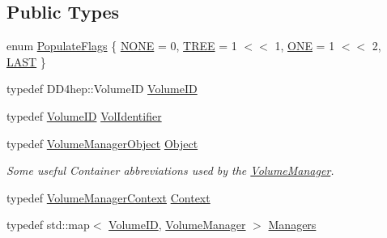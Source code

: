 \subsection*{Public Types}
\begin{DoxyCompactItemize}
\item 
enum \hyperlink{class_d_d4hep_1_1_geometry_1_1_volume_manager_a1c25b37c1377654bf2fbe1cf4743ebde}{Populate\+Flags} \{ \hyperlink{class_d_d4hep_1_1_geometry_1_1_volume_manager_a1c25b37c1377654bf2fbe1cf4743ebdea8562837522298e9c40ab9cd35d9307ba}{N\+O\+NE} = 0, 
\hyperlink{class_d_d4hep_1_1_geometry_1_1_volume_manager_a1c25b37c1377654bf2fbe1cf4743ebdeaf55015e5bb5659a574e760177f74324f}{T\+R\+EE} = 1 $<$$<$ 1, 
\hyperlink{class_d_d4hep_1_1_geometry_1_1_volume_manager_a1c25b37c1377654bf2fbe1cf4743ebdeafbb9de2f3dcf9fbe2da0b22fa5cafac1}{O\+NE} = 1 $<$$<$ 2, 
\hyperlink{class_d_d4hep_1_1_geometry_1_1_volume_manager_a1c25b37c1377654bf2fbe1cf4743ebdea50ba5350b45be9b9e1b328d3069b572c}{L\+A\+ST}
 \}
\item 
typedef D\+D4hep\+::\+Volume\+ID \hyperlink{class_d_d4hep_1_1_geometry_1_1_volume_manager_ab1f746b561c93be38bc7c6e66fc8ca8a}{Volume\+ID}
\item 
typedef \hyperlink{class_d_d4hep_1_1_geometry_1_1_volume_manager_ab1f746b561c93be38bc7c6e66fc8ca8a}{Volume\+ID} \hyperlink{class_d_d4hep_1_1_geometry_1_1_volume_manager_a934cf07a47c6c2d9932aef080f789da8}{Vol\+Identifier}
\item 
typedef \hyperlink{class_d_d4hep_1_1_geometry_1_1_volume_manager_object}{Volume\+Manager\+Object} \hyperlink{class_d_d4hep_1_1_geometry_1_1_volume_manager_ac464fd441e5c72fb082e8cc6dd0937c4}{Object}
\begin{DoxyCompactList}\small\item\em Some useful Container abbreviations used by the \hyperlink{class_d_d4hep_1_1_geometry_1_1_volume_manager}{Volume\+Manager}. \end{DoxyCompactList}\item 
typedef \hyperlink{class_d_d4hep_1_1_geometry_1_1_volume_manager_context}{Volume\+Manager\+Context} \hyperlink{class_d_d4hep_1_1_geometry_1_1_volume_manager_adadb14f2ccbeaad001b7bc6ddb6dc715}{Context}
\item 
typedef std\+::map$<$ \hyperlink{class_d_d4hep_1_1_geometry_1_1_volume_manager_ab1f746b561c93be38bc7c6e66fc8ca8a}{Volume\+ID}, \hyperlink{class_d_d4hep_1_1_geometry_1_1_volume_manager}{Volume\+Manager} $>$ \hyperlink{class_d_d4hep_1_1_geometry_1_1_volume_manager_ad60f5618f569c6604861b6e0eb1c71c9}{Managers}
\item 

\end{DoxyCompactItemize}
